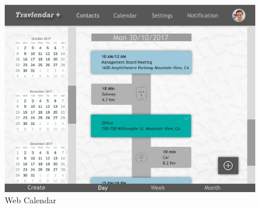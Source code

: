 \begin{figure}[!h]
\begin{minipage}{.65\textwidth}
		\centering
		\includegraphics[width=\linewidth]{Images/Mockups/MockupCalendarWeb.png}
		\caption{Web Calendar}
	\end{minipage}
\end{figure}

